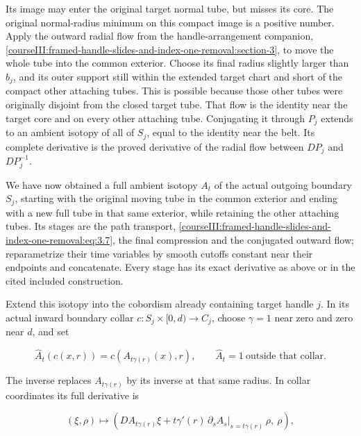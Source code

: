 Its image may enter the original target normal tube, but misses its core. The original normal-radius minimum on this compact image is a positive number. Apply the outward radial flow from the handle-arrangement companion, \cref{courseIII:framed-handle-slides-and-index-one-removal:section-3}, to move the whole tube into the common exterior. Choose its final radius slightly larger than \(b_j\), and its outer support still within the extended target chart and short of the compact other attaching tubes. This is possible because those other tubes were originally disjoint from the closed target tube. That flow is the identity near the target core and on every other attaching tube. Conjugating it through \(P_j\) extends to an ambient isotopy of all of \(S_j\), equal to the identity near the belt. Its complete derivative is the proved derivative of the radial flow between \(DP_j\) and \(DP_j^{-1}\).

We have now obtained a full ambient isotopy \(A_t\) of the actual outgoing boundary \(S_j\), starting with the original moving tube in the common exterior and ending with a new full tube in that same exterior, while retaining the other attaching tubes. Its stages are the path transport, \eqref{courseIII:framed-handle-slides-and-index-one-removal:eq:3.7}, the final compression and the conjugated outward flow; reparametrize their time variables by smooth cutoffs constant near their endpoints and concatenate. Every stage has its exact derivative as above or in the cited included construction.

Extend this isotopy into the cobordism already containing target handle \(j\). In its actual inward boundary collar \(c:S_j\times[0,d)\to C_j\), choose \(\gamma=1\) near zero and zero near \(d\), and set

\begin{equation}
\widehat A_t(c(x,r))=c(A_{t\gamma(r)}(x),r),
 \qquad \widehat A_t=1\ \text{outside that collar}.
 \label{courseIII:framed-handle-slides-and-index-one-removal:eq:3.13}
\end{equation}

The inverse replaces \(A_{t\gamma(r)}\) by its inverse at that same radius. In collar coordinates its full derivative is

\begin{equation}
(\xi,\rho)\longmapsto
 \left(D A_{t\gamma(r)}\xi
    +t\gamma'(r)\,\partial_sA_s|_{s=t\gamma(r)}\,\rho,\ \rho\right),
 \label{courseIII:framed-handle-slides-and-index-one-removal:eq:3.14}
\end{equation}

